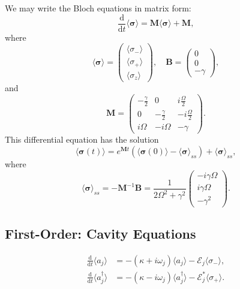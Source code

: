 \documentclass{article}
\newcommand{\ddt}[1][]{\frac{\mathrm{d} #1}{\mathrm{d}t}}
\begin{document}
We may write the Bloch equations in matrix form:
\begin{equation}
	\ddt \langle \bm{\sigma} \rangle = \bm{M} \langle \bm{\sigma} \rangle + \bm{M},
\end{equation}
where
\begin{equation}
	\langle \bm{\sigma} \rangle =
	\begin{pmatrix}
		\langle \sigma_{-} \rangle \\
		\langle \sigma_{+} \rangle \\
		\langle \sigma_{z} \rangle
	\end{pmatrix}
	, \quad \bm{B} =
	\begin{pmatrix}
		0 \\
		0 \\
		- \gamma
	\end{pmatrix},
\end{equation}
and
\begin{equation}
	\bm{M} =
	\begin{pmatrix}
		-\frac{\gamma}{2} & 0 & i \frac{\Omega}{2} \\
		0 & -\frac{\gamma}{2} & -i \frac{\Omega}{2} \\
		i \Omega & -i \Omega & -\gamma
	\end{pmatrix}.
\end{equation}
This differential equation has the solution
\begin{equation}
	\langle \bm{\sigma}(t) \rangle = e^{\bm{M} t} \left( \langle \bm{\sigma}(0) \rangle - \langle \bm{\sigma} \rangle_{ss} \right) + \langle \bm{\sigma} \rangle_{ss},
\end{equation}
where
\begin{equation}
	\langle \bm{\sigma} \rangle_{ss} = -\bm{M}^{-1} \bm{B} = \frac{1}{2\Omega^{2} + \gamma^{2}}
	\begin{pmatrix}
		-i \gamma \Omega \\
		i \gamma \Omega \\
		-\gamma^{2}
	\end{pmatrix}.
\end{equation}

\subsection{First-Order: Cavity Equations}

\begin{subequations}
	\begin{align}
		\ddt \langle a_{j} \rangle &= -\left( \kappa + i \omega_{j} \right) \langle a_{j} \rangle - \mathcal{E}_{j} \langle \sigma_{-} \rangle, \\
		\ddt \langle a^{\dagger}_{j} \rangle &= -\left( \kappa - i \omega_{j} \right) \langle a^{\dagger}_{j} \rangle - \mathcal{E}_{j}^{*} \langle \sigma_{+} \rangle.
	\end{align}
\end{subequations}
\end{document}
